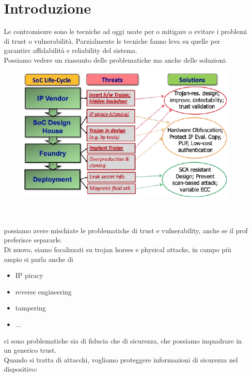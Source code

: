 \documentclass[oneside, 12pt]{extbook}
\begin{document}
\section{Introduzione}
Le contromisure sono le tecniche ad oggi usate per o mitigare o evitare i problemi di trust o vulnerabilità. Parzialmente le tecniche fanno leva su quelle per garantire affidabilità e reliability del sistema.
\\Possiamo vedere un riassunto delle problematiche ma anche delle soluzioni:\\
\begin{figure}[!h]
	\includegraphics[scale=0.5]{immagini/hardware/hw_treats_sol.png}
\end{figure}
\\\\possiamo avere mischiate le problematiche di trust e vulnerability, anche se il prof preferisce separarle.
\\Di nuovo, siamo focalizzati su trojan horses e physical attacks, in campo più ampio si parla anche di
\begin{itemize}
	\item IP piracy
	\item reverse engineering
	\item tampering
	\item ...
\end{itemize} 
ci sono problematiche sia di fiducia che di sicurezza, che possiamo inquadrare in un generico trust.
\\Quando si tratta di attacchi, vogliamo proteggere informazioni di sicurezza nel dispositivo:
\end{document}
